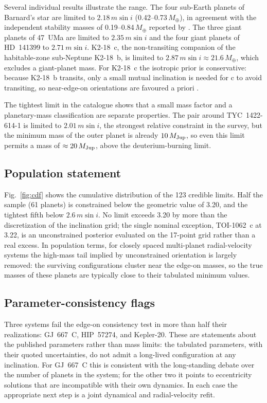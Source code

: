 \documentclass[fleqn,usenatbib]{mnras}
\newcommand{\msini}{m\sin i}
\newcommand{\mjup}{M_{\rm Jup}}
\newcommand{\mearth}{M_\oplus}
\begin{document}
Several individual results illustrate the range. The four sub-Earth
planets of Barnard's star are limited to $2.18\,\msini$
(0.42--0.73\,$\mearth$), in agreement with the independent stability
masses of 0.19--0.84\,$\mearth$ reported by \citet{Byrne2026}. The three
giant planets of 47~UMa are limited to $2.35\,\msini$ and the four giant
planets of HD~141399 to $2.71\,\msini$. K2-18~c, the non-transiting
companion of the habitable-zone sub-Neptune K2-18~b, is limited to
$2.87\,\msini \approx 21.6\,\mearth$, which excludes a giant-planet mass.
For K2-18~c the isotropic prior is conservative: because K2-18~b transits,
only a small mutual inclination is needed for c to avoid transiting, so
near-edge-on orientations are favoured a priori \citep{Cloutier2017}.

The tightest limit in the catalogue shows that a small mass factor and a
planetary-mass classification are separate properties. The pair around
TYC~1422-614-1 is limited to $2.01\,\msini$, the strongest relative
constraint in the survey, but the minimum mass of the outer planet is
already $10\,\mjup$, so even this limit permits a mass of
$\approx 20\,\mjup$, above the deuterium-burning limit.

\subsection{Population statement} \label{sec:population}

Fig.~\ref{fig:cdf} shows the cumulative distribution of the 123 credible
limits. Half the sample (61 planets) is constrained below the geometric
value of 3.20, and the tightest fifth below $2.6\,\msini$. No limit
exceeds 3.20 by more than the discretization of the inclination grid; the
single nominal exception, TOI-1062~c at 3.22, is an unconstrained
posterior evaluated on the 17-point grid rather than a real excess. In
population terms, for closely spaced multi-planet radial-velocity systems
the high-mass tail implied by unconstrained orientation is largely
removed: the surviving configurations cluster near the edge-on masses, so
the true masses of these planets are typically close to their tabulated
minimum values.

\subsection{Parameter-consistency flags} \label{sec:flags}

Three systems fail the edge-on consistency test in more than half their
realizations: GJ~667~C, HIP~57274, and Kepler-20. These are statements
about the published parameters rather than mass limits: the tabulated
parameters, with their quoted uncertainties, do not admit a long-lived
configuration at any inclination. For GJ~667~C this is consistent with the
long-standing debate over the number of planets in the system; for the
other two it points to eccentricity solutions that are incompatible with
their own dynamics. In each case the appropriate next step is a joint
dynamical and radial-velocity refit.
\end{document}
